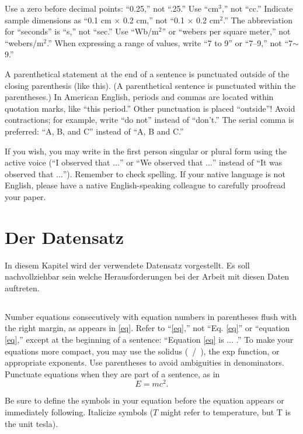 \documentclass[journal,twoside,web]{ieeecolor}
\begin{document}
Use a zero before decimal points: ``0.25,'' not ``.25.'' Use 
``cm$^{3}$,'' not ``cc.'' Indicate sample dimensions as ``0.1 cm 
$\times $ 0.2 cm,'' not ``0.1 $\times $ 0.2 cm$^{2}$.'' The 
abbreviation for ``seconds'' is ``s,'' not ``sec.'' Use 
``Wb/m$^{2}$'' or ``webers per square meter,'' not 
``webers/m$^{2}$.'' When expressing a range of values, write ``7 to 
9'' or ``7--9,'' not ``7$\sim $9.''

A parenthetical statement at the end of a sentence is punctuated outside of 
the closing parenthesis (like this). (A parenthetical sentence is punctuated 
within the parentheses.) In American English, periods and commas are located within 
quotation marks, like ``this period.'' Other punctuation is placed ``outside''! 
Avoid contractions; for example, write ``do not'' instead of ``don't.'' The 
serial comma is preferred: ``A, B, and C'' instead of ``A, B and C.''

If you wish, you may write in the first person singular or plural form using
the active voice (``I observed that $\ldots$'' or ``We observed that $\ldots$'' 
instead of ``It was observed that $\ldots$''). Remember to check spelling. If 
your native language is not English, please have a native English-speaking 
colleague to carefully proofread your paper.

\section{Der Datensatz}
In diesem Kapitel wird der verwendete Datensatz vorgestellt. Es soll nachvollziehbar sein welche Herausforderungen bei der Arbeit mit diesen Daten auftreten. 
\subsection{}
Number equations consecutively with equation numbers in parentheses flush 
with the right margin, as appears in \eqref{eq}. Refer to ``\eqref{eq},'' not ``Eq. \eqref{eq}'' 
or ``equation \eqref{eq},'' except at the beginning of a sentence: ``Equation \eqref{eq} 
is $\ldots$ .'' To make your equations more 
compact, you may use the solidus (~/~), the exp function, or appropriate 
exponents. Use parentheses to avoid ambiguities in denominators. Punctuate 
equations when they are part of a sentence, as in
\begin{equation}E=mc^2.\label{eq}\end{equation}

Be sure to define the symbols in your equation before the equation appears or
immediately following. Italicize symbols ($T$ might refer 
to temperature, but T is the unit tesla).
\end{document}
